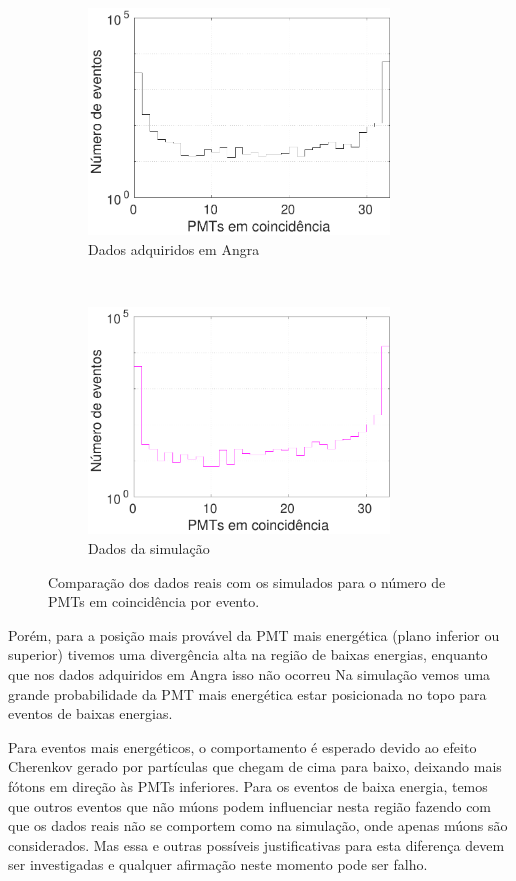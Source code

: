 \begin{figure}[ht]
	\centering
	\begin{subfigure}{0.5\textwidth}
		\centering
	\includegraphics[width=8cm]{textuais/simulacao/figuras/firedpmt_real_comp.pdf}
		\caption{Dados adquiridos em Angra}
		\label{fig:fired_real_comp}
	\end{subfigure}%
	~ 
	\begin{subfigure}{0.5\textwidth}
		\centering
	\includegraphics[width=8cm]{textuais/simulacao/figuras/firedpmt_sim_comp.pdf}
		\caption{Dados da simulação}
				\label{fig:fired_sim_comp}
	\end{subfigure}
	\caption{Comparação dos dados reais com os simulados para o número de PMTs em coincidência por evento.}
\end{figure}

Porém, para a posição mais provável da PMT mais energética (plano inferior ou superior) tivemos uma divergência alta na região de baixas energias, enquanto que nos dados adquiridos em Angra isso não ocorreu Na simulação vemos uma grande probabilidade da PMT mais energética estar posicionada no topo para eventos de baixas energias.

Para eventos mais energéticos, o comportamento é esperado devido ao efeito Cherenkov gerado por partículas que chegam de cima para baixo, deixando mais fótons em direção às PMTs inferiores. Para os eventos de baixa energia, temos que outros eventos que não múons podem influenciar nesta região fazendo com que os dados reais não se comportem como na simulação, onde apenas múons são considerados. Mas essa e outras possíveis justificativas para esta diferença devem ser investigadas e qualquer afirmação neste momento pode ser falho.

